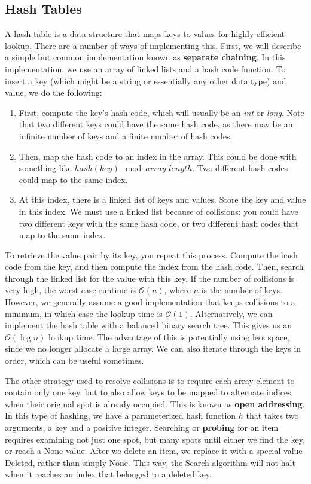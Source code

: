 \documentclass{article}
\newcommand{\bigO}{\mathcal{O}}
\begin{document}
    \subsection{Hash Tables}
    A hash table is a data structure that maps keys to values for highly efficient lookup. There are a number of ways of implementing this. First, we will describe a simple but common implementation known as \textbf{separate chaining}. In this implementation, we use an array of linked lists and a hash code function. To insert a key (which might be a string or essentially any other data type) and value, we do the following: 
    \begin{enumerate}
        \item 
        First, compute the key's hash code, which will usually be an \textit{int} or \textit{long}. Note that two different keys could have the same hash code, as there may be an infinite number of keys and a finite number of hash codes.
        \item
        Then, map the hash code to an index in the array. This could be done with something like $hash(key)\mod array\_length$. Two different hash codes could map to the same index.
        \item
        At this index, there is a linked list of keys and values. Store the key and value in this index. We must use a linked list because of collisions: you could have two different keys with the same hash code, or two different hash codes that map to the same index.
    \end{enumerate}
    To retrieve the value pair by its key, you repeat this process. Compute the hash code from the key, and then compute the index from the hash code. Then, search through the linked list for the value with this key. If the number of collisions is very high, the worst case runtime is $\bigO(n)$, where $n$ is the number of keys. However, we generally assume a good implementation that keeps collisions to a minimum, in which case the lookup time is $\bigO(1)$. Alternatively, we can implement the hash table with a balanced binary search tree. This gives us an $\bigO(\log n)$ lookup time. The advantage of this is potentially using less space, since we no longer allocate a large array. We can also iterate through the keys in order, which can be useful sometimes.

    The other strategy used to resolve collisions is to require each array element to contain only one key, but to also allow keys to be mapped to alternate indices when their original spot is already occupied. This is known as \textbf{open addressing}. In this type of hashing, we have a parameterized hash function $h$ that takes two arguments, a key and a positive integer. Searching or \textbf{probing} for an item requires examining not just one spot, but many spots until either we find the key, or reach a None value. After we delete an item, we replace it with a special value Deleted, rather than simply None. This way, the Search algorithm will not halt when it reaches an index that belonged to a deleted key.
    
\end{document}

